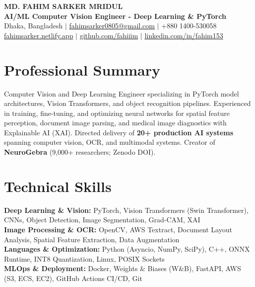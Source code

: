 \documentclass[9.5pt,a4paper]{article}
\begin{document}
{\centering
    {\Large \textbf{MD. FAHIM SARKER MRIDUL}}\\[1pt]
    \textbf{AI/ML Computer Vision Engineer - Deep Learning \& PyTorch}\\[1pt]
    Dhaka, Bangladesh \;$\vert$\; \href{mailto:fahimsarker0805@gmail.com}{fahimsarker0805@gmail.com} \;$\vert$\; +880 1400-530058\\[1pt]
    \href{https://fahimsarker.netlify.app}{fahimsarker.netlify.app} \;$\vert$\; \href{https://github.com/fahiiim}{github.com/fahiiim} \;$\vert$\; \href{https://linkedin.com/in/fahim153}{linkedin.com/in/fahim153}\par
}

\vspace{-4.5pt}
\section*{Professional Summary}
Computer Vision and Deep Learning Engineer specializing in PyTorch model architectures, Vision Transformers, and object recognition pipelines. Experienced in training, fine-tuning, and optimizing neural networks for spatial feature perception, document image parsing, and medical image diagnostics with Explainable AI (XAI). Directed delivery of \textbf{20+ production AI systems} spanning computer vision, OCR, and multimodal systems. Creator of \textbf{NeuroGebra} (9,000+ researchers; Zenodo DOI).

\section*{Technical Skills}
\noindent
\textbf{Deep Learning \& Vision:} PyTorch, Vision Transformers (Swin Transformer), CNNs, Object Detection, Image Segmentation, Grad-CAM, XAI\\
\textbf{Image Processing \& OCR:} OpenCV, AWS Textract, Document Layout Analysis, Spatial Feature Extraction, Data Augmentation\\
\textbf{Languages \& Optimization:} Python (Asyncio, NumPy, SciPy), C++, ONNX Runtime, INT8 Quantization, Linux, POSIX Sockets\\
\textbf{MLOps \& Deployment:} Docker, Weights \& Biases (W\&B), FastAPI, AWS (S3, ECS, EC2), GitHub Actions CI/CD, Git
\end{document}
